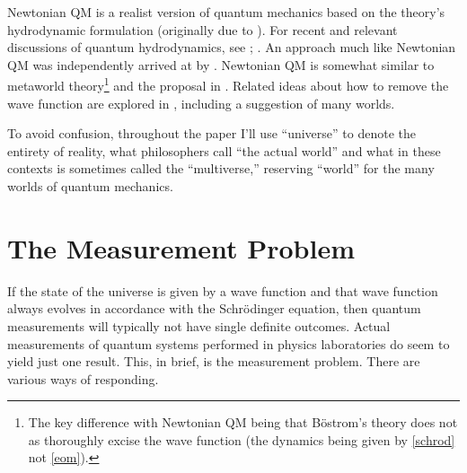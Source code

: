 \documentclass[onecolumn,secnumarabic,balancelastpage,amsmath,amssymb,nofootinbib]{article}
\begin{document}

Newtonian QM is a realist version of quantum mechanics based on the theory's hydrodynamic formulation (originally due to \citealp{madelung1927}).  For recent and relevant discussions of quantum hydrodynamics, see \citet{wyatt2005}; \citet{holland2005}.  An approach much like Newtonian QM was independently arrived at by \cite{HDW}.  Newtonian QM is somewhat similar to  \citeyearpar{bostrom2012} metaworld theory\footnote{The key difference with Newtonian QM being that B\"{o}strom's theory does not as thoroughly excise the wave function (the dynamics being given by \eqref{schrod} not \eqref{eom}).} and the proposal in \citet{tipler}.  Related ideas about how to remove the wave function are explored in \citet{poirier2010, schiff2012}, including a suggestion of many worlds.

To avoid confusion, throughout the paper I'll use ``universe'' to denote the entirety of reality, what philosophers call ``the actual world'' and what in these contexts is sometimes called the ``multiverse,'' reserving ``world'' for the many worlds of quantum mechanics.

\section{The Measurement Problem}\label{measprob}

If the state of the universe is given by a wave function and that wave function always evolves in accordance with the Schr\"{o}dinger equation, then quantum measurements will typically not have single definite outcomes.  Actual measurements of quantum systems performed in physics laboratories do seem to yield just one result.  This, in brief, is the measurement problem.  There are various ways of responding.
\end{document}
